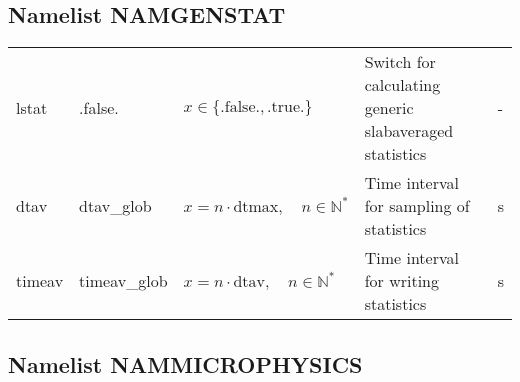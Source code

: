 \documentclass[twoside,11pt,fleqn,a4paper,english,openright]{report}
\begin{document}
\subsection{Namelist NAMGENSTAT}\label{par:namgenstat}
\begin{center}
  \tablelasttail{
        &&&&\\\hline
  }
\begin{supertabular}{|l|p{2cm}|p{4cm}|p{6cm}|l|}
  lstat		& .false.	& $x\in\{\text{.false.},\text{.true.}\}$	& Switch for calculating generic slabaveraged statistics	& -\\
  dtav		& dtav\_glob	& $x = n \cdot \text{dtmax}, \quad n \in \mathbb{N}^*$	& Time interval for sampling of statistics	& s\\
  timeav	& timeav\_glob	& $x = n \cdot \text{dtav}, \quad n \in \mathbb{N}^*$	& Time interval for writing statistics		& s\\
\end{supertabular}
\end{center}

\newpage
\subsection{Namelist NAMMICROPHYSICS}\label{par:microphysics}
\end{document}

